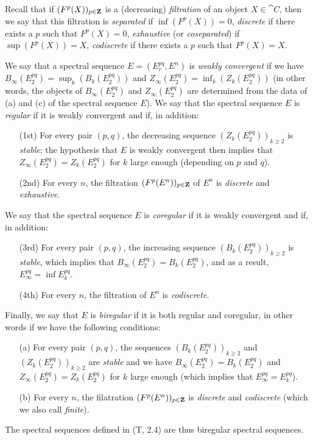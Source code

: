 \begin{env}[11.1.3]
\label{0.11.1.3}
Recall that if $(F^p(X))_{p\in\mathbf{Z}}$ is a (decreasing) \emph{filtration} of an object $X\in\cat{C}$, then we say that this filtration is \emph{separated} if $\inf(F^p(X))=0$, \emph{discrete} if there exists a $p$ such that $F^p(X)=0$, \emph{exhaustive} (or \emph{coseparated}) if $\sup(F^p(X))=X$, \emph{codiscrete} if there exists a $p$ such that $F^p(X)=X$.

We say that a spectral sequence $E=(E_r^{pq},E^n)$ is \emph{weakly convergent} if we have $B_\infty(E_2^{pq})=\sup_k(B_k(E_2^{pq}))$ and $Z_\infty(E_2^{pq})=\inf_k(Z_k(E_2^{pq}))$ (in other words, the objects of $B_\infty(E_2^{pq})$ and $Z_\infty(E_2^{pq})$ are determined from the data of (a) and (c) of the spectral sequence $E$).
We say that the spectral sequence $E$ is \emph{regular} if it is weakly convergent and if, in addition:
\begin{enumerate}
  \item[(1st)] For every pair $(p,q)$, the decreasing sequence $(Z_k(E_2^{pq}))_{k\geq 2}$ is \emph{stable}; the hypothesis that $E$ is weakly convergent then implies that $Z_\infty(E_2^{pq})=Z_k(E_2^{pq})$ for $k$ large enough (depending on $p$ and $q$).
  \item[(2nd)] For every $n$, the filtration $(F^p(E^n))_{p\in\mathbf{Z}}$ of $E^n$ is \emph{discrete} and \emph{exhaustive}.
\end{enumerate}

We say that the spectral sequence $E$ is \emph{coregular} if it is weakly convergent and if, in addition:
\begin{enumerate}
  \item[(3rd)] For every pair $(p,q)$, the increasing sequence $(B_k(E_2^{pq}))_{k\geq 2}$ is \emph{stable}, which implies that $B_\infty(E_2^{pq})=B_k(E_2^{pq})$, and as a result, $E_\infty^{pq}=\inf E_k^{pq}$.
  \item[(4th)] For every $n$, the filtration of $E^n$ is \emph{codiscrete}.
\end{enumerate}

Finally, we say that $E$ is \emph{biregular} if it is both regular and coregular, in other words if we have the following conditions:
\begin{enumerate}
  \item[(a)] For every pair $(p,q)$, the sequences $(B_k(E_2^{pq}))_{k\geq 2}$ and $(Z_k(E_2^{pq}))_{k\geq 2}$ are \emph{stable} and we have $B_\infty(E_2^{pq})=B_k(E_2^{pq})$ and $Z_\infty(E_2^{pq})=Z_k(E_2^{pq})$ for $k$ large enough (which implies that $E_\infty^{pq}=E_k^{pq}$).
  \item[(b)] For every $n$, the filatration $(F^p(E^n))_{p\in\mathbf{Z}}$ is \emph{discrete} and \emph{codiscrete} (which we also call \emph{finite}).
\end{enumerate}

The spectral sequences defined in (T, 2.4) are thus biregular spectral sequences.
\end{env}

